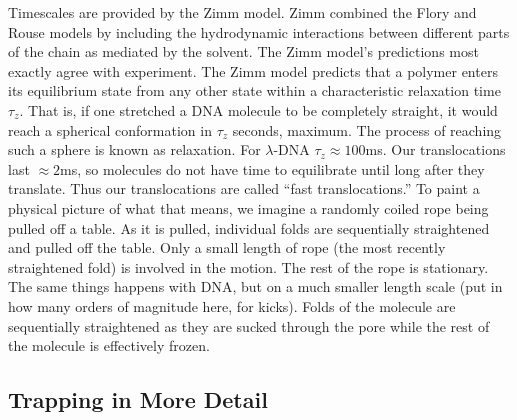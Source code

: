 \documentclass[aps,prl,preprint,groupedaddress]{revtex4}
\begin{document}
Timescales are provided by the Zimm model.
Zimm combined the Flory and Rouse models by including the hydrodynamic interactions between different parts of the chain as mediated by the solvent.
The Zimm model's predictions most exactly agree with experiment. The Zimm model predicts that a polymer enters its equilibrium state from any other state within a characteristic relaxation time \(\tau_z\).
That is, if one stretched a DNA molecule to be completely straight, it would reach a spherical conformation in \(\tau_z\) seconds, maximum.
The process of reaching such a sphere is known as relaxation.
For \(\lambda\)-DNA \(\tau_z \approx 100\)ms.
Our translocations last \(\approx 2\)ms, so molecules do not have time to equilibrate until long after they translate.
Thus our translocations are called ``fast translocations.'' To paint a physical picture of what that means, we imagine a randomly coiled rope being pulled off a table.
As it is pulled, individual folds are sequentially straightened and pulled off the table.
Only a small length of rope (the most recently straightened fold) is involved in the motion.
The rest of the rope is stationary.
The same things happens with DNA, but on a much smaller length scale (put in how many orders of magnitude here, for kicks).
Folds of the molecule are sequentially straightened as they are sucked through the pore while the rest of the molecule is effectively frozen.

\subsection{Trapping in More Detail}
\end{document}
